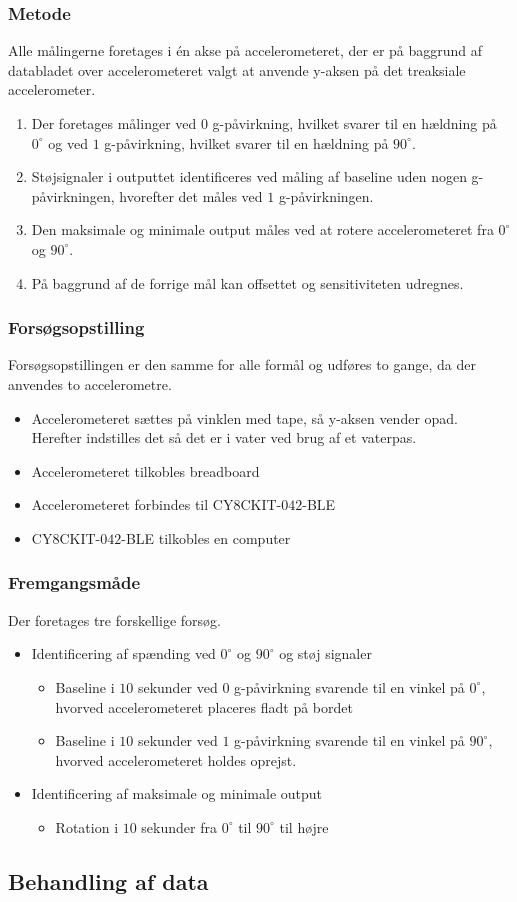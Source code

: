 \subsubsection{Metode}
Alle målingerne foretages i én akse på accelerometeret, der er på baggrund af databladet over accelerometeret valgt at anvende y-aksen på det treaksiale accelerometer. 
\begin{enumerate}
\item Der foretages målinger ved $0$ g-påvirkning, hvilket svarer til en hældning på $0^{\circ}$ og ved $1$ g-påvirkning, hvilket svarer til en hældning på $90^{\circ}$. 
\item Støjsignaler i outputtet identificeres ved måling af baseline uden nogen g-påvirkningen, hvorefter det måles ved $1$ g-påvirkningen. 
\item Den maksimale og minimale output måles ved at rotere accelerometeret fra $0^{\circ}$ og $90^{\circ}$.
\item På baggrund af de forrige mål kan offsettet og sensitiviteten udregnes.
\end{enumerate}

\subsubsection{Forsøgsopstilling}
Forsøgsopstillingen er den samme for alle formål og udføres to gange, da der anvendes to accelerometre.
\begin{itemize}
\item Accelerometeret sættes på vinklen med tape, så y-aksen vender opad. Herefter indstilles det så det er i vater ved brug af et vaterpas.
\item Accelerometeret tilkobles breadboard
\item Accelerometeret forbindes til CY$8$CKIT-$042$-BLE
\item CY$8$CKIT-$042$-BLE tilkobles en computer
\end{itemize}

\subsubsection{Fremgangsmåde}
Der foretages tre forskellige forsøg.
\begin{itemize}
\item Identificering af spænding ved $0^{\circ}$ og $90^{\circ}$ og støj signaler
\begin{itemize}
\item Baseline i $10$ sekunder ved $0$ g-påvirkning svarende til en vinkel på $0^{\circ}$, hvorved accelerometeret placeres fladt på bordet
\item Baseline i $10$ sekunder ved $1$ g-påvirkning svarende til en vinkel på $90^{\circ}$, hvorved accelerometeret holdes oprejst.
\end{itemize}
\item Identificering af maksimale og minimale output 
\begin{itemize}
\item Rotation i $10$ sekunder fra $0^{\circ}$ til $90^{\circ}$ til højre
\end{itemize}
\end{itemize}


\subsection{Behandling af data}
